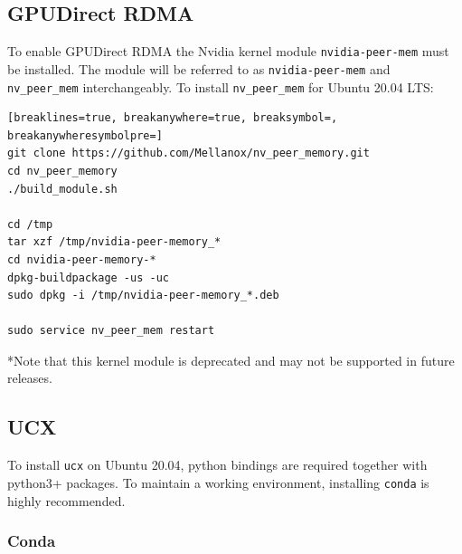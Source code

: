 \documentclass[a4paper,onecolumn]{article}
\begin{document}
\subsection{GPUDirect RDMA}

To enable GPUDirect RDMA the Nvidia kernel module \verb|nvidia-peer-mem| must be installed. The module will be referred to as \verb|nvidia-peer-mem| and \verb|nv_peer_mem| interchangeably. To install \verb|nv_peer_mem| for Ubuntu 20.04 LTS:

\begin{Verbatim}[breaklines=true, breakanywhere=true, breaksymbol=, breakanywheresymbolpre=]
git clone https://github.com/Mellanox/nv_peer_memory.git
cd nv_peer_memory
./build_module.sh

cd /tmp
tar xzf /tmp/nvidia-peer-memory_*
cd nvidia-peer-memory-*
dpkg-buildpackage -us -uc
sudo dpkg -i /tmp/nvidia-peer-memory_*.deb

sudo service nv_peer_mem restart
\end{Verbatim}

*Note that this kernel module is deprecated and may not be supported in future releases.

\subsection{UCX}

To install \verb|ucx| on Ubuntu 20.04, python bindings are required together with python3+ packages. To maintain a working environment, installing \verb|conda| is highly recommended. 

\subsubsection{Conda}
\end{document}
